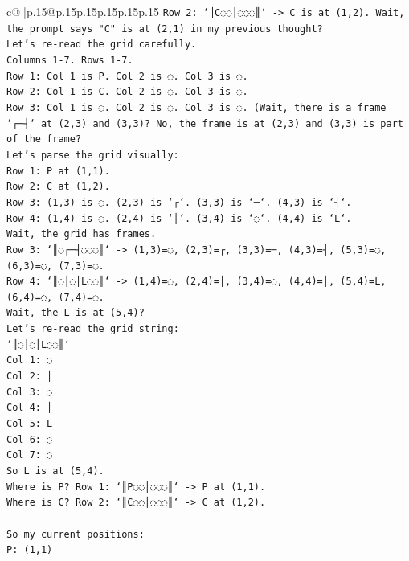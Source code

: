 \documentclass{article}
\begin{document}
{\begin{supertabular}{c@{$\;$}|p{.15\linewidth}@{}p{.15\linewidth}p{.15\linewidth}p{.15\linewidth}p{.15\linewidth}p{.15\linewidth}}
{{{\texttt{Row 2: `║C◌◌│◌◌◌║` {-}> C is at (1,2). Wait, the prompt says "C" is at (2,1) in my previous thought?} \\
\texttt{Let's re{-}read the grid carefully.} \\
\texttt{Columns 1{-}7. Rows 1{-}7.} \\
\texttt{Row 1: Col 1 is P. Col 2 is ◌. Col 3 is ◌.} \\
\texttt{Row 2: Col 1 is C. Col 2 is ◌. Col 3 is ◌.} \\
\texttt{Row 3: Col 1 is ◌. Col 2 is ◌. Col 3 is ◌. (Wait, there is a frame `┌─┤` at (2,3) and (3,3)? No, the frame is at (2,3) and (3,3) is part of the frame?} \\
\texttt{Let's parse the grid visually:} \\
\texttt{Row 1: P at (1,1).} \\
\texttt{Row 2: C at (1,2).} \\
\texttt{Row 3: (1,3) is ◌. (2,3) is `┌`. (3,3) is `─`. (4,3) is `┤`.} \\
\texttt{Row 4: (1,4) is ◌. (2,4) is `│`. (3,4) is `◌`. (4,4) is `L`.} \\
\texttt{Wait, the grid has frames.} \\
\texttt{Row 3: `║◌┌─┤◌◌◌║` {-}> (1,3)=◌, (2,3)=┌, (3,3)=─, (4,3)=┤, (5,3)=◌, (6,3)=◌, (7,3)=◌.} \\
\texttt{Row 4: `║◌│◌│L◌◌║` {-}> (1,4)=◌, (2,4)=│, (3,4)=◌, (4,4)=│, (5,4)=L, (6,4)=◌, (7,4)=◌.} \\
\texttt{Wait, the L is at (5,4)?} \\
\texttt{Let's re{-}read the grid string:} \\
\texttt{`║◌│◌│L◌◌║`} \\
\texttt{Col 1: ◌} \\
\texttt{Col 2: │} \\
\texttt{Col 3: ◌} \\
\texttt{Col 4: │} \\
\texttt{Col 5: L} \\
\texttt{Col 6: ◌} \\
\texttt{Col 7: ◌} \\
\texttt{So L is at (5,4).} \\
\texttt{Where is P? Row 1: `║P◌◌│◌◌◌║` {-}> P at (1,1).} \\
\texttt{Where is C? Row 2: `║C◌◌│◌◌◌║` {-}> C at (1,2).} \\
\\ 
\texttt{So my current positions:} \\
\texttt{P: (1,1)} \\
}}}
\end{supertabular}}
\end{document}
